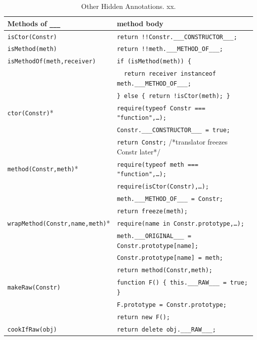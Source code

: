\documentclass[letterpaper,twocolumn,10pt]{article}
\newcommand{\code}[1]{{\tt {#1}}}              %
\begin{document}
\begin{table}
\begin{tabular}{ll}
  Methods of \code{\_\_\_}  & method body \\ 
  \hline 
  \code{isCtor(Constr)}
       & \code{return !!Constr.\_\_\_CONSTRUCTOR\_\_\_;} \\
  \code{isMethod(meth)}
       & \code{return !!meth.\_\_\_METHOD\_OF\_\_\_;} \\
  \code{isMethodOf(meth,receiver)}
       & \code{if (isMethod(meth))\ \{} \\
       & \code{\ \ return receiver instanceof meth.\_\_\_METHOD\_OF\_\_\_;} \\
       & \code{\} else\ \{ return !isCtor(meth); \}} \\
  \hline
  \code{ctor(Constr)}*
       & \code{require(typeof Constr === "function",\ldots);} \\
       & \code{Constr.\_\_\_CONSTRUCTOR\_\_\_ = true;} \\
       & \code{return Constr;} /*translator freezes Constr later*/ \\
  \code{method(Constr,meth)}*
       & \code{require(typeof meth === "function",\ldots);} \\
       & \code{require(isCtor(Constr),\ldots);} \\
       & \code{meth.\_\_\_METHOD\_OF\_\_\_ = Constr;} \\
       & \code{return freeze(meth);} \\
  \code{wrapMethod(Constr,name,meth)}*
       & \code{require(name in Constr.prototype,\ldots);}\\
       & \code{meth.\_\_\_ORIGINAL\_\_\_ = Constr.prototype[name];}\\
       & \code{Constr.prototype[name] = meth;}\\
       & \code{return method(Constr,meth);}\\
  \hline
  \code{makeRaw(Constr)}
       & \code{function F()\ \{ this.\_\_\_RAW\_\_\_ = true; \}} \\
       & \code{F.prototype = Constr.prototype;} \\
       & \code{return new F();} \\
  \code{cookIfRaw(obj)}
       & \code{return delete obj.\_\_\_RAW\_\_\_;} \\
\end{tabular}

\caption[Other Hidden Annotations.]{Other Hidden Annotations. xx.}
\label{tab:hide-note}
\end{table}
\end{document}
